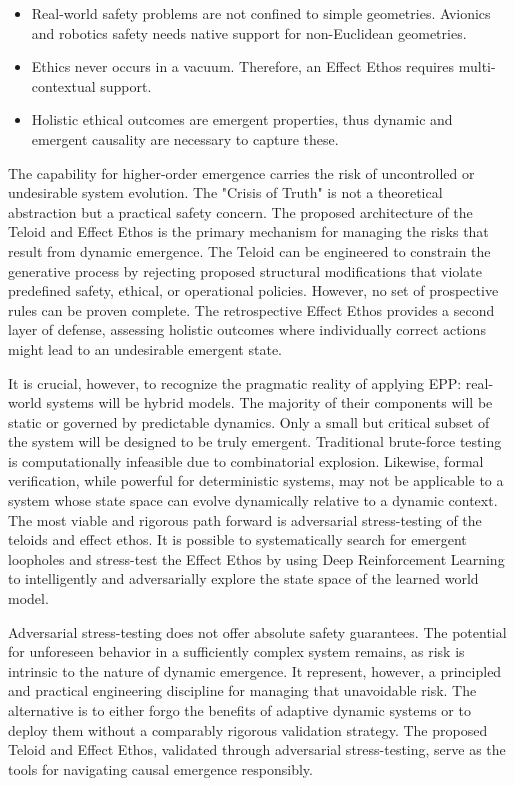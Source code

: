 \begin{itemize}
    \item Real-world safety problems are not confined to simple geometries. Avionics and robotics safety needs native support
  for non-Euclidean geometries.
    \item Ethics never occurs in a vacuum. Therefore, an Effect Ethos requires multi-contextual support.
    \item Holistic ethical outcomes are emergent properties, thus dynamic and emergent causality are necessary to capture these.
\end{itemize}

The capability for higher-order emergence carries the risk of uncontrolled or undesirable system evolution. The "Crisis of Truth" is not a theoretical abstraction but a practical safety concern. The proposed architecture of the Teloid and Effect Ethos is the primary mechanism for managing the risks that result from dynamic emergence. The Teloid can be engineered to constrain the generative process by rejecting proposed structural modifications that violate predefined safety, ethical, or operational policies. However, no set of prospective rules can be proven complete. The retrospective Effect Ethos provides a second layer of defense, assessing holistic outcomes where individually correct actions might lead to an undesirable emergent state. 

It is crucial, however, to recognize the pragmatic reality of applying EPP: real-world systems will be hybrid models. The majority of their components will be static or governed by predictable dynamics. Only a small but critical subset of the system will be designed to be truly emergent.
Traditional brute-force testing is computationally infeasible due to combinatorial explosion. 
Likewise, formal verification, while powerful for deterministic systems, may not be applicable to a system whose state space can evolve dynamically relative to a dynamic context.
The most viable and rigorous path forward is adversarial stress-testing of the teloids and effect ethos. 
It is possible to systematically search for emergent loopholes and stress-test the Effect Ethos
by using Deep Reinforcement Learning to intelligently and adversarially explore the state space of the learned world model.

Adversarial stress-testing  does not offer absolute safety guarantees. The potential for unforeseen behavior in a sufficiently complex system remains, as risk is intrinsic to the nature of dynamic emergence. It represent, however, a principled and practical engineering discipline for managing that unavoidable risk. 
The alternative is to either forgo the benefits of adaptive dynamic systems or to deploy them without a comparably rigorous validation strategy. 
The proposed Teloid and Effect Ethos, validated through adversarial stress-testing, serve as the tools for navigating causal emergence responsibly.

